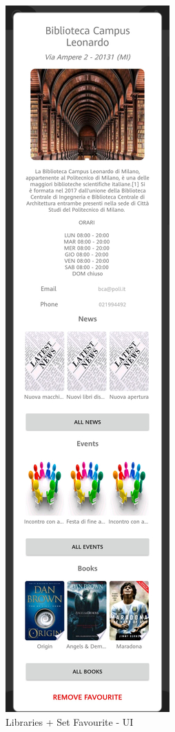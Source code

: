 \begin{figure}[H]
	\includegraphics[scale=0.15]{Images/UI/Libraries/3}
	\caption{Libraries + Set Favourite - UI}
\end{figure}

